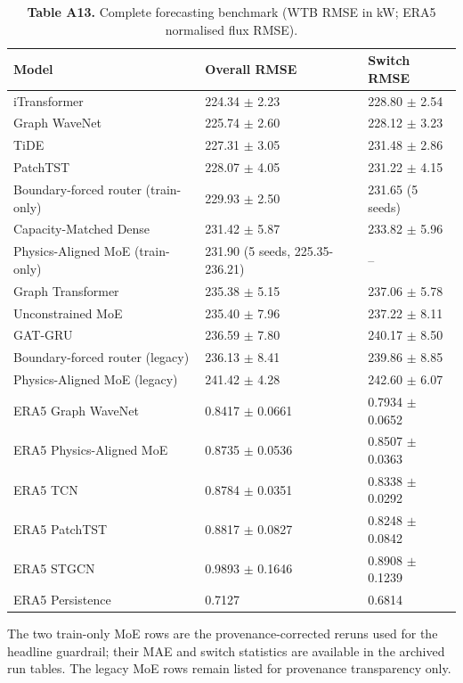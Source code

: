 \documentclass[
  journal]{IEEEtran}
\begin{document}
\begin{table}[!t]
\centering
\fontsize{8.0pt}{9.6pt}\selectfont
\setlength{\tabcolsep}{2.6pt}
\renewcommand{\arraystretch}{1.05}
\caption*{\textbf{Table A13.} Complete forecasting benchmark (WTB RMSE in kW; ERA5 normalised flux RMSE).}
%
\begin{tabular}{lll}
\toprule
Model & Overall RMSE & Switch RMSE \\
\midrule
iTransformer & 224.34 $\pm$ 2.23 & 228.80 $\pm$ 2.54 \\
Graph WaveNet & 225.74 $\pm$ 2.60 & 228.12 $\pm$ 3.23 \\
TiDE & 227.31 $\pm$ 3.05 & 231.48 $\pm$ 2.86 \\
PatchTST & 228.07 $\pm$ 4.05 & 231.22 $\pm$ 4.15 \\
Boundary-forced router (train-only) & 229.93 $\pm$ 2.50 & 231.65 (5 seeds) \\
Capacity-Matched Dense & 231.42 $\pm$ 5.87 & 233.82 $\pm$ 5.96 \\
Physics-Aligned MoE (train-only) & 231.90 (5 seeds, 225.35-236.21) & -- \\
Graph Transformer & 235.38 $\pm$ 5.15 & 237.06 $\pm$ 5.78 \\
Unconstrained MoE & 235.40 $\pm$ 7.96 & 237.22 $\pm$ 8.11 \\
GAT-GRU & 236.59 $\pm$ 7.80 & 240.17 $\pm$ 8.50 \\
Boundary-forced router (legacy) & 236.13 $\pm$ 8.41 & 239.86 $\pm$ 8.85 \\
Physics-Aligned MoE (legacy) & 241.42 $\pm$ 4.28 & 242.60 $\pm$ 6.07 \\
\midrule
ERA5 Graph WaveNet & 0.8417 $\pm$ 0.0661 & 0.7934 $\pm$ 0.0652 \\
ERA5 Physics-Aligned MoE & 0.8735 $\pm$ 0.0536 & 0.8507 $\pm$ 0.0363 \\
ERA5 TCN & 0.8784 $\pm$ 0.0351 & 0.8338 $\pm$ 0.0292 \\
ERA5 PatchTST & 0.8817 $\pm$ 0.0827 & 0.8248 $\pm$ 0.0842 \\
ERA5 STGCN & 0.9893 $\pm$ 0.1646 & 0.8908 $\pm$ 0.1239 \\
ERA5 Persistence & 0.7127 & 0.6814 \\
\bottomrule
\end{tabular}
\vspace{1mm}
\fontsize{8.0pt}{9.6pt}\selectfont The two train-only MoE rows are the provenance-corrected reruns used for the headline guardrail; their MAE and switch statistics are available in the archived run tables. The legacy MoE rows remain listed for provenance transparency only.
\end{table}
\end{document}
